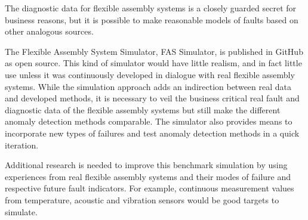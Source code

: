 \documentclass[procedia]{easychair}
\begin{document}
The diagnostic data for flexible assembly systems is a closely guarded secret for business reasons, but it is possible to make reasonable models
of faults based on other analogous sources.

The Flexible Assembly System Simulator, FAS Simulator, is published in GitHub \cite{FASSimulator} as open source. This kind of simulator would have
little realism, and in fact little use unless it was continuously developed in dialogue with real flexible assembly systems. While the simulation
approach adds an indirection between real data and developed methods, it is necessary to veil the business critical real fault and diagnostic
data of the flexible assembly systems but still make the different anomaly detection methods comparable. The simulator also provides means to incorporate new types of
failures and test anomaly detection methods in a quick iteration.

Additional research is needed to improve this benchmark simulation by using experiences from real flexible assembly systems and their modes of failure
and respective future fault indicators. For example, continuous measurement values from temperature, acoustic and vibration sensors would be good targets
to simulate.

\label{sect:bib}



\appendix
\end{document}
